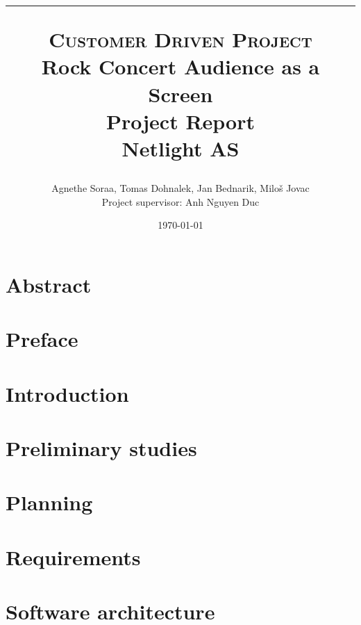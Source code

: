 \documentclass[11pt]{report}
\title{
	\hrule
    \normalsize \textsc{Customer Driven Project}\\
    \Huge Rock Concert Audience as a Screen\\[10pt]
    \normalsize Project Report\\[10pt]
    Netlight AS
    \horrule{2pt}
    }
\author{Agnethe Soraa,
Tomas Dohnalek,
Jan Bednarik,
Miloš Jovac \\
\normalsize Project supervisor: Anh Nguyen Duc}
\date{\today}
\begin{document}
\maketitle

\setcounter{page}{2}
\chapter*{Abstract}


\chapter*{Preface}


\tableofcontents



\listoffigures
\listoftables

\chapter{Introduction}
\setcounter{page}{1}


\chapter{Preliminary studies}


\chapter{Planning} \label{txt:planning}


\chapter{Requirements}


%

\chapter{Software architecture}

\end{document}
